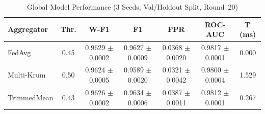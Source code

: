 \begin{table}[!t]
\renewcommand{\arraystretch}{1.15}
\caption{Global Model Performance (3 Seeds, Val/Holdout Split, Round~20)}
\label{tab:clean}
\centering\scriptsize\setlength{\tabcolsep}{3pt}
\begin{tabular}{lcccccc}
\hline
\textbf{Aggregator} & \textbf{Thr.} & \textbf{W-F1} & \textbf{F1} & \textbf{FPR} & \textbf{ROC-AUC} & \textbf{T\,(ms)} \\
\hline
FedAvg & 0.45 & 0.9629 $\pm$ 0.0002 & 0.9627 $\pm$ 0.0009 & 0.0368 $\pm$ 0.0020 & 0.9817 $\pm$ 0.0001 & 0.000 \\
Multi-Krum & 0.50 & 0.9624 $\pm$ 0.0005 & 0.9589 $\pm$ 0.0020 & 0.0321 $\pm$ 0.0042 & 0.9800 $\pm$ 0.0004 & 1.529 \\
TrimmedMean & 0.43 & 0.9626 $\pm$ 0.0002 & 0.9634 $\pm$ 0.0006 & 0.0387 $\pm$ 0.0011 & 0.9812 $\pm$ 0.0001 & 0.267 \\
\hline\end{tabular}\end{table}